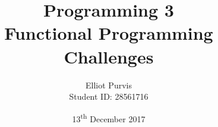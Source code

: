 \begin{titlepage}
\title{Programming 3 \\ Functional Programming Challenges}
\author{Elliot Purvis \\ Student ID: 28561716}
\date{13\textsuperscript{th} December 2017}
\maketitle
\end{titlepage}
